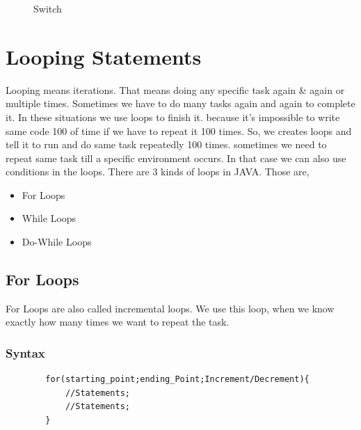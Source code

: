 \documentclass[openany]{book}  %
\begin{document}
% 
% 
\begin{figure}[htbp]
    \begin{center}
        \caption{Switch\cite{Ref3}}
    \end{center}
\end{figure}

\newpage

% 
% 
\section{Looping Statements}
Looping means iterations. That means doing any specific task again \& again or multiple times. Sometimes we have to do many tasks again and again to complete it. In these situations
we use loops to finish it. because it's impossible to write same code 100 of time if we have to repeat it 100 times. So, we creates loops and tell it to run and do same task repeatedly 100 times.
sometimes we need to repeat same task till a specific environment occurs. In that case we can also use conditions in the loops. There are 3 kinds of loops in JAVA. Those are,
\begin{itemize}
    \item For Loops
    \item While Loops
    \item Do-While Loops
\end{itemize}
% 
% 
\subsection{For Loops}
For Loops are also called incremental loops. We use this loop, when we know exactly how many times we want to repeat the task.
% 
% 
\subsubsection{Syntax}
\begin{center}
    \begin{verbatim}
        for(starting_point;ending_Point;Increment/Decrement){
            //Statements;
            //Statements;
        }
    \end{verbatim}
\end{center}
% 
% 
\end{document}
